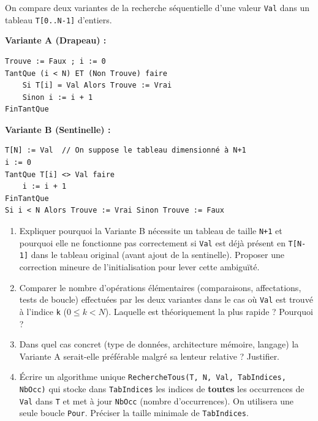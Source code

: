 \documentclass[11pt]{article}
\begin{document}
\begin{exercice}
On compare deux variantes de la recherche séquentielle d'une valeur \texttt{Val} dans un tableau \texttt{T[0..N-1]} d'entiers.

\textbf{Variante A (Drapeau) :}
\begin{verbatim}
Trouve := Faux ; i := 0
TantQue (i < N) ET (Non Trouve) faire
    Si T[i] = Val Alors Trouve := Vrai
    Sinon i := i + 1
FinTantQue
\end{verbatim}

\textbf{Variante B (Sentinelle) :}
\begin{verbatim}
T[N] := Val  // On suppose le tableau dimensionné à N+1
i := 0
TantQue T[i] <> Val faire
    i := i + 1
FinTantQue
Si i < N Alors Trouve := Vrai Sinon Trouve := Faux
\end{verbatim}

\begin{enumerate}
    \item Expliquer pourquoi la Variante B nécessite un tableau de taille \texttt{N+1} et pourquoi elle ne fonctionne pas correctement si \texttt{Val} est déjà présent en \texttt{T[N-1]} dans le tableau original (avant ajout de la sentinelle). Proposer une correction mineure de l'initialisation pour lever cette ambiguïté.
    \item Comparer le nombre d'opérations élémentaires (comparaisons, affectations, tests de boucle) effectuées par les deux variantes dans le cas où \texttt{Val} est trouvé à l'indice \texttt{k} ($0 \le k < N$). Laquelle est théoriquement la plus rapide ? Pourquoi ?
    \item Dans quel cas concret (type de données, architecture mémoire, langage) la Variante A serait-elle préférable malgré sa lenteur relative ? Justifier.
    \item Écrire un algorithme unique \texttt{RechercheTous(T, N, Val, TabIndices, NbOcc)} qui stocke dans \texttt{TabIndices} les indices de \textbf{toutes} les occurrences de \texttt{Val} dans \texttt{T} et met à jour \texttt{NbOcc} (nombre d'occurrences). On utilisera une seule boucle \texttt{Pour}. Préciser la taille minimale de \texttt{TabIndices}.
\end{enumerate}
\end{exercice}
\end{document}
